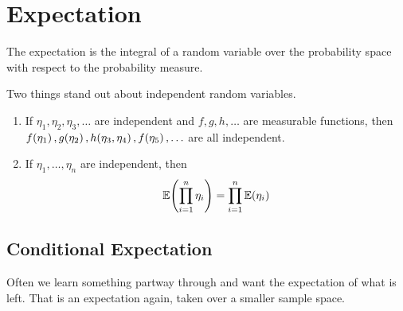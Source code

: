 \section{Expectation}

The expectation is the integral of a random variable over the probability space with respect to the probability measure.

Two things stand out about independent random variables.

\begin{enumerate}
    \item If $\eta_1, \eta_2, \eta_3, \ldots$ are independent and $f, g, h, \ldots$ are measurable functions, then $f\!\left( \eta_1 \right), g\!\left( \eta_2 \right), h\!\left( \eta_3, \eta_4 \right), f\!\left( \eta_5 \right), \ldots$ are all independent.

    \item If $\eta_1, \ldots, \eta_n$ are independent, then
    \begin{align*}
        \mathbb{E}\!\left( \prod_{i=1}^{n} \eta_i \right) = \prod_{i=1}^{n} \mathbb{E}\!\left( \eta_i \right)
    \end{align*}
\end{enumerate}

\subsection{Conditional Expectation}

Often we learn something partway through and want the expectation of what is left. That is an expectation again, taken over a smaller sample space.

